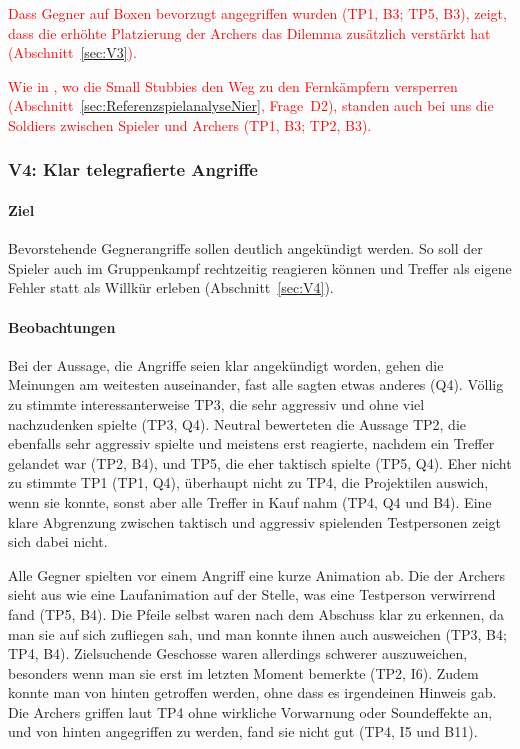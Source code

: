 \documentclass[../Main.tex]{subfiles}
\begin{document}
\textcolor{red}{Dass Gegner auf Boxen bevorzugt angegriffen wurden (TP1, B3; TP5, B3), zeigt, dass die erhöhte Platzierung der Archers das Dilemma zusätzlich verstärkt hat (Abschnitt~\ref{sec:V3}).}

\textcolor{red}{Wie in , wo die Small Stubbies den Weg zu den Fernkämpfern versperren (Abschnitt~\ref{sec:ReferenzspielanalyseNier}, Frage~D2), standen auch bei uns die Soldiers zwischen Spieler und Archers (TP1, B3; TP2, B3).}

\subsubsection{V4: Klar telegrafierte Angriffe}

\paragraph{Ziel}
Bevorstehende Gegnerangriffe sollen deutlich angekündigt werden. So soll der Spieler auch im Gruppenkampf rechtzeitig reagieren können und Treffer als eigene Fehler statt als Willkür erleben (Abschnitt~\ref{sec:V4}).

\paragraph{Beobachtungen}
Bei der Aussage, die Angriffe seien klar angekündigt worden, gehen die Meinungen am weitesten auseinander, fast alle sagten etwas anderes (Q4). Völlig zu stimmte interessanterweise TP3, die sehr aggressiv und ohne viel nachzudenken spielte (TP3, Q4). Neutral bewerteten die Aussage TP2, die ebenfalls sehr aggressiv spielte und meistens erst reagierte, nachdem ein Treffer gelandet war (TP2, B4), und TP5, die eher taktisch spielte (TP5, Q4). Eher nicht zu stimmte TP1 (TP1, Q4), überhaupt nicht zu TP4, die Projektilen auswich, wenn sie konnte, sonst aber alle Treffer in Kauf nahm (TP4, Q4 und B4). Eine klare Abgrenzung zwischen taktisch und aggressiv spielenden Testpersonen zeigt sich dabei nicht.

Alle Gegner spielten vor einem Angriff eine kurze Animation ab. Die der Archers sieht aus wie eine Laufanimation auf der Stelle, was eine Testperson verwirrend fand (TP5, B4). Die Pfeile selbst waren nach dem Abschuss klar zu erkennen, da man sie auf sich zufliegen sah, und man konnte ihnen auch ausweichen (TP3, B4; TP4, B4). Zielsuchende Geschosse waren allerdings schwerer auszuweichen, besonders wenn man sie erst im letzten Moment bemerkte (TP2, I6). Zudem konnte man von hinten getroffen werden, ohne dass es irgendeinen Hinweis gab. Die Archers griffen laut TP4 ohne wirkliche Vorwarnung oder Soundeffekte an, und von hinten angegriffen zu werden, fand sie nicht gut (TP4, I5 und B11).
\end{document}
